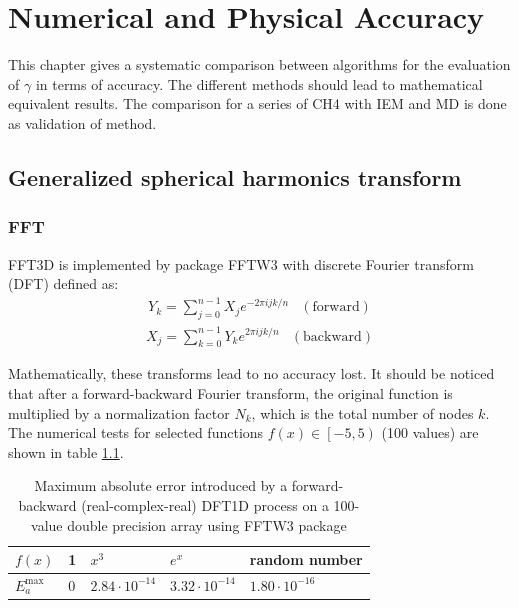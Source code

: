 
\chapter{Numerical and Physical Accuracy}

\label{chpt:accuracy}This chapter gives a systematic comparison between
algorithms for the evaluation of $\gamma$ in terms of accuracy. The
different methods should lead to mathematical equivalent results.
The comparison for a series of CH4 with IEM and MD is done as validation
of method.


\section{Generalized spherical harmonics transform\label{sec:gsh-imp}}


\subsection{FFT}

FFT3D is implemented by package FFTW3 \citep{FFTW3} with discrete
Fourier transform (DFT) defined as: 
\begin{equation}
\begin{array}{ll}
{\displaystyle Y_{k}=\sum_{j=0}^{n-1}X_{j}e^{-2\pi ijk/n}} & \mathrm{(forward)}\end{array}
\end{equation}
\begin{equation}
\begin{array}{ll}
{\displaystyle X_{j}=\sum_{k=0}^{n-1}Y_{k}e^{2\pi ijk/n}} & \mathrm{(backward)}\end{array}
\end{equation}


Mathematically, these transforms lead to no accuracy lost. It should
be noticed that after a forward-backward Fourier transform, the original
function is multiplied by a normalization factor $N_{k}$, which is
the total number of nodes $k$. The numerical tests for selected functions
$f(x)\in\left[-5,5\right)$ (100 values) are shown in table \ref{tab:error-dft1d-1}.
\begin{table}[h]
\begin{centering}
\begin{tabular*}{1\linewidth}{@{\extracolsep{\fill}}llllc}
\toprule 
$f(x)$ & 1 & $x^{3}$ & $e^{x}$ & random number\tabularnewline
\midrule
$E_{a}^{\mathrm{max}}$ & 0 & $2.84\cdot10^{-14}$ & $3.32\cdot10^{-14}$ & \multicolumn{1}{l}{$1.80\cdot10^{-16}$}\tabularnewline
\bottomrule
\end{tabular*}
\par\end{centering}

\caption{Maximum absolute error introduced by a forward-backward (real-complex-real)
DFT1D process on a 100-value double precision array using FFTW3 package\label{tab:error-dft1d-1}}
\end{table}


